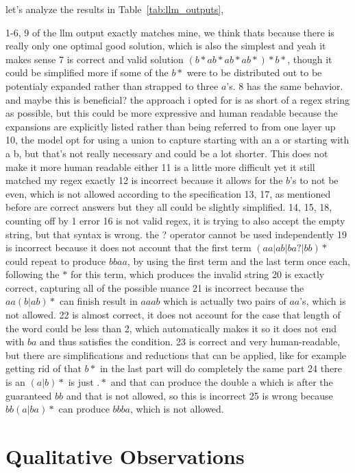 let's analyze the results in Table~\ref{tab:llm_outputs}, 

1-6, 9 of the llm output exactly matches mine, we think thats because there is really only one optimal good solution, which is also the simplest and yeah it makes sense
7 is correct and valid solution $(b*ab*ab*ab*)*b*$, though it could be simplified more if some of the $b*$ were to be distributed out to be potentialy expanded rather than strapped to three $a$'s. 8 has the same behavior. and maybe this is beneficial? the approach i opted for is as short of a regex string as possible, but this could be more expressive and human readable because the expansions are explicitly listed rather than being referred to from one layer up
10, the model opt for using a union to capture starting with an a or starting with a b, but that's not really necessary and could be a lot shorter. This does not make it more human readable either
11 is a little more difficult yet it still matched my regex exactly
12 is incorrect because it allows for the $b$'s to not be even, which is not allowed according to the specification
13, 17, as mentioned before are correct answers but they all could be slightly simplified.
14, 15, 18, counting off by 1 error
16 is not valid regex, it is trying to also accept the empty string, but that syntax is wrong. the ? operator cannot be used independently
19 is incorrect because it does not account that the first term $(aa|ab|ba?|bb)*$ could repeat to produce $bbaa$, by using the first term and the last term once each, following the $*$ for this term, which produces the invalid string
20 is exactly correct, capturing all of the possible nuance
21 is incorrect because the $aa(b|ab)*$ can finish result in $aaab$ which is actually two pairs of $aa$'s, which is not allowed. 
22 is almost correct, it does not account for the case that length of the word could be less than 2, which automatically makes it so it does not end with $ba$ and thus satisfies the condition.
23 is correct and very human-readable, but there are simplifications and reductions that can be applied, like for example getting rid of that $b*$ in the last part will do completely the same part
24 there is an $(a|b)*$ is just $.*$ and that can produce the double a which is after the guaranteed $bb$ and that is not allowed, so this is incorrect
25 is wrong because $bb(a|ba)*$ can produce $bbba$, which is not allowed.
\section{Qualitative Observations}

